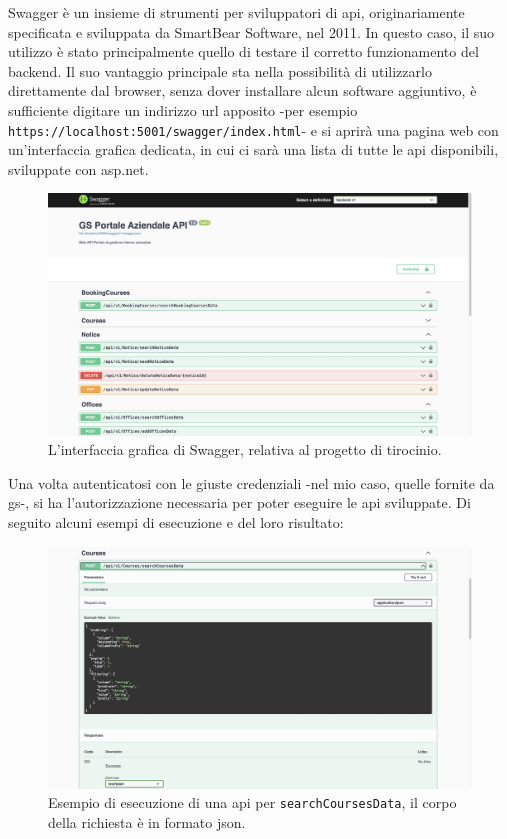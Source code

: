 Swagger è un insieme di strumenti per sviluppatori di \acrshort{api}, originariamente specificata e sviluppata da SmartBear Software, nel 2011. 
In questo caso, il suo utilizzo è stato principalmente quello di testare il corretto funzionamento del backend. Il suo vantaggio principale sta nella possibilità di utilizzarlo direttamente dal browser, senza dover installare alcun software aggiuntivo, è sufficiente digitare un indirizzo \acrshort{url} apposito -per esempio \texttt{https://localhost:5001/swagger/index.html}- e si aprirà una pagina web con un'interfaccia grafica dedicata, in cui ci sarà una lista di tutte le \acrshort{api} disponibili, sviluppate con \acrshort{asp.net}.
\begin{figure}[H]
\centering
\includegraphics[width=1\textwidth]{Images/swagger.jpg}
\caption{\label{fig:swagger}L'interfaccia grafica di Swagger, relativa al progetto di tirocinio.}
\end{figure}
Una volta autenticatosi con le giuste credenziali -nel mio caso, quelle fornite da \acrlong{gs}-, si ha l'autorizzazione necessaria per poter eseguire le \acrshort{api} sviluppate. Di seguito alcuni esempi di esecuzione e del loro risultato:
\begin{figure}[H]
\centering
\includegraphics[width=1\textwidth]{Images/swagger courses.jpg}
\caption{\label{fig:swagger courses}Esempio di esecuzione di una \acrshort{api} per \texttt{searchCoursesData}, il corpo della richiesta è in formato \acrshort{json}.}
\end{figure}

